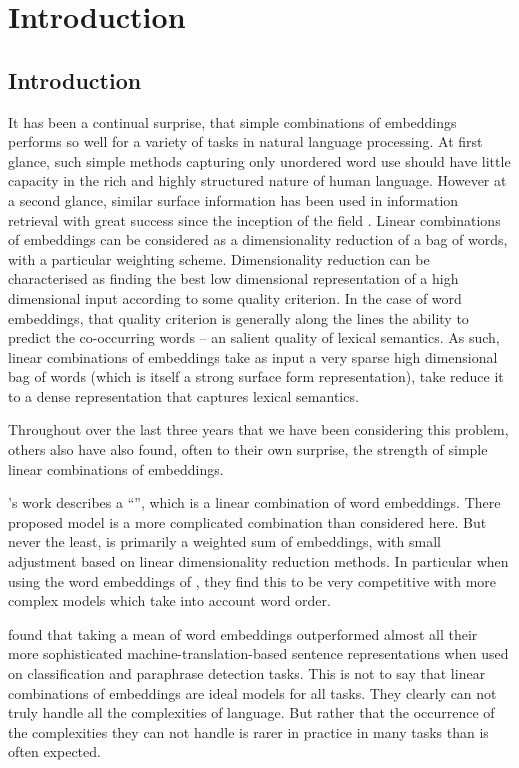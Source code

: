 \documentclass{book}
\begin{document}
\part {Introduction}
	
\chapter{Introduction}

It has been a continual surprise, that simple combinations of embeddings performs so well for a variety of tasks in natural language processing.
At first glance, such simple methods capturing only unordered word use should have little capacity in the rich and highly structured nature of human language.
However at a second glance, similar surface information has been used in information retrieval with great success since the inception of the field \citep{maron1961automatic}.
Linear combinations of embeddings can be considered as a dimensionality reduction of a bag of words, with a particular weighting scheme.
Dimensionality reduction can be characterised as finding the best low dimensional representation of a high dimensional input according to some quality criterion.
In the case of word embeddings, that quality criterion is generally along the lines the ability to predict the co-occurring words -- an salient quality of lexical semantics.
As such, linear combinations of embeddings take as input a very sparse high dimensional bag of words (which is itself a strong surface form representation),
take reduce it to a dense representation that captures lexical semantics.

Throughout over the last three years that we have been considering this problem,
others also have also found, often to their own surprise,
the strength of simple linear combinations of embeddings.

\citet{arora2016simple}'s work describes a ``'',
which is a linear combination of word embeddings.
There proposed model is a more complicated combination than considered here.
But never the least, is primarily a weighted sum of embeddings, with small adjustment based on linear dimensionality reduction methods.
In particular when using the word embeddings of \citet{wieting2015towards}, they find this to be very competitive with more complex models which take into account word order.

\citet{acl2018bleuopposedmeaning} found that taking a mean of word embeddings outperformed almost all their more sophisticated machine-translation-based sentence representations when used on classification and paraphrase detection tasks.
This is not to say that linear combinations of embeddings are ideal models for all tasks.
They clearly can not truly handle all the complexities of language.
But rather that the occurrence of the complexities they can not handle is rarer in practice in many tasks than is often expected.
\end{document}
